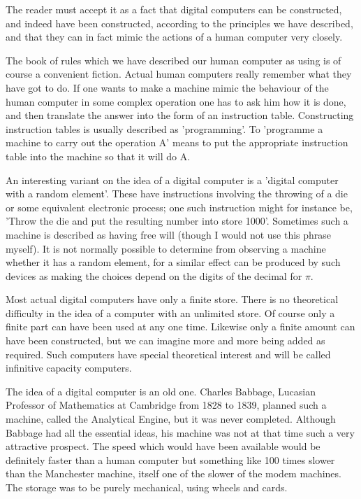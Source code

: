 \documentclass[12pt]{article}
\begin{document}
    The reader must accept it as a fact that digital computers can be constructed, and indeed have been constructed, according to the principles we have described, and that they can in fact mimic the actions of a human computer very closely.

    The book of rules which we have described our human computer as using is of course a convenient fiction. Actual human computers really remember what they have got to do. If one wants to make a machine mimic the behaviour of the human computer in some complex operation one has to ask him how it is done, and then translate the answer into the form of an instruction table. Constructing instruction tables is usually described as 'programming'. To 'programme a machine to carry out the operation A' means to put the appropriate instruction table into the machine so that it will do A.

    An interesting variant on the idea of a digital computer is a 'digital computer with a random element'. These have instructions involving the throwing of a die or some equivalent electronic process; one such instruction might for instance be, 'Throw the die and put the resulting number into store 1000'. Sometimes such a machine is described as having free will (though I would not use this phrase myself). It is not normally possible to determine from observing a machine whether it has a random element, for a similar effect can be produced by such devices as making the choices depend on the digits of the decimal for $\pi$.

    Most actual digital computers have only a finite store. There is no theoretical difficulty in the idea of a computer with an unlimited store. Of course only a finite part can have been used at any one time. Likewise only a finite amount can have been constructed, but we can imagine more and more being added as required. Such computers have special theoretical interest and will be called infinitive capacity computers.

    The idea of a digital computer is an old one. Charles Babbage, Lucasian Professor of Mathematics at Cambridge from 1828 to 1839, planned such a machine, called the Analytical Engine, but it was never completed. Although Babbage had all the essential ideas, his machine was not at that time such a very attractive prospect. The speed which would have been available would be definitely faster than a human computer but something like 100 times slower than the Manchester machine, itself one of the slower of the modem machines. The storage was to be purely mechanical, using wheels and cards.
\end{document}
